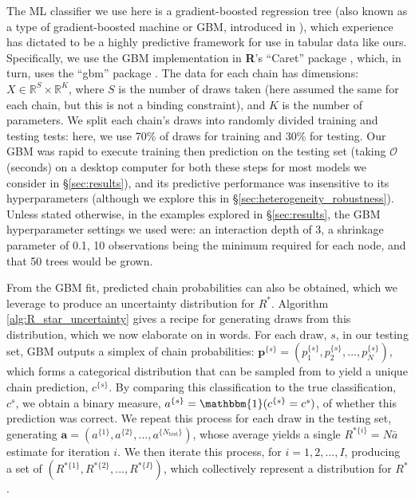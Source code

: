 \documentclass{article}
\begin{document}
The ML classifier we use here is a gradient-boosted regression tree (also known as a type of gradient-boosted machine or GBM, introduced in \cite{friedman2001greedy}), which experience has dictated to be a highly predictive framework for use in tabular data \citep{chollet2018} like ours. Specifically, we use the GBM implementation in \textbf{\textsf{R}}'s ``Caret'' package \citep{kuhn2008building}, which, in turn, uses the ``gbm'' package \citep{greenwell2019package}. The data for each chain has dimensions: $X\in \mathbb{R}^{S}\times \mathbb{R}^{K}$, where $S$ is the number of draws taken (here assumed the same for each chain, but this is not a binding constraint), and $K$ is the number of parameters. We split each chain's draws into randomly divided training and testing tests: here, we use 70\% of draws for training and 30\% for testing. Our GBM was rapid to execute training then prediction on the testing set (taking $\mathcal{O}$(seconds) on a desktop computer for both these steps for most models we consider in \S\ref{sec:results}), and its predictive performance was insensitive to its hyperparameters (although we explore this in \S\ref{sec:heterogeneity_robustness}). Unless stated otherwise, in the examples explored in \S\ref{sec:results}, the GBM hyperparameter settings we used were: an interaction depth of 3, a shrinkage parameter of 0.1, 10 observations being the minimum required for each node, and that 50 trees would be grown.

From the GBM fit, predicted chain probabilities can also be obtained, which we leverage to produce an uncertainty distribution for $R^*$. Algorithm \ref{alg:R_star_uncertainty} gives a recipe for generating draws from this distribution, which we now elaborate on in words. For each draw, $s$, in our testing set, GBM outputs a simplex of chain probabilities: $\boldsymbol{p}^{\{s\}}=(p_1^{\{s\}},p_2^{\{s\}},...,p_N^{\{s\}})$, which forms a categorical distribution that can be sampled from to yield a unique chain prediction, $c^{\{s\}}$. By comparing this classification to the true classification, $c^s$, we obtain a binary measure, $a^{\{s\}}=\mathbbm{1}(c^{\{s\}}=c^s)$, of whether this prediction was correct. We repeat this process for each draw in the testing set, generating $\boldsymbol{a}=(a^{\{1\}},a^{\{2\}},...,a^{\{N_\text{test}\}})$, whose average yields a single $R^{*\{i\}}=N \bar{a}$ estimate for iteration $i$. We then iterate this process, for $i=1,2,...,I$, producing a set of $(R^{*\{1\}},R^{*\{2\}},...,R^{*\{I\}})$, which collectively represent a distribution for $R^*$. 
\end{document}
